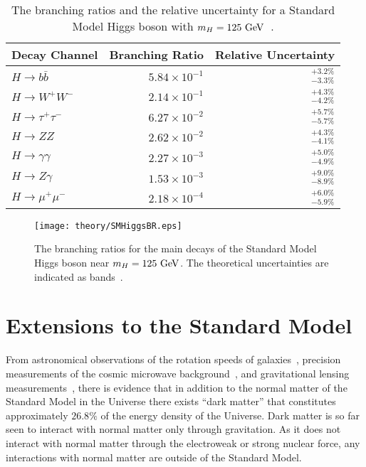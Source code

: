 \begin{table}[htpb]
 \centering
 \caption[The branching ratios and the relative uncertainty for a Standard Model Higgs boson with $m_{H}=125~\GeV$.]{%
  The branching ratios and the relative uncertainty for a Standard Model Higgs boson with $m_{H}=125~\GeV$~\cite{PDG2018:Ch11}.}
 \begin{tabular}{@{}lrr@{}} \toprule
  Decay Channel           & Branching Ratio       & Relative Uncertainty \\ \midrule
  $H\to b\bar{b}$         & $5.84 \times 10^{-1}$ & $_{-3.3\%}^{+3.2\%}$ \\
  \addlinespace[0.3em]
  $H\to W^{+}W^{-}$       & $2.14 \times 10^{-1}$ & $_{-4.2\%}^{+4.3\%}$ \\
  \addlinespace[0.3em]
  $H\to \tau^{+}\tau^{-}$ & $6.27 \times 10^{-2}$ & $_{-5.7\%}^{+5.7\%}$ \\
  \addlinespace[0.3em]
  $H\to ZZ$               & $2.62 \times 10^{-2}$ & $_{-4.1\%}^{+4.3\%}$ \\
  \addlinespace[0.3em]
  $H\to \gamma\gamma$     & $2.27 \times 10^{-3}$ & $_{-4.9\%}^{+5.0\%}$ \\
  \addlinespace[0.3em]
  $H\to Z\gamma$          & $1.53 \times 10^{-3}$ & $_{-8.9\%}^{+9.0\%}$ \\
  \addlinespace[0.3em]
  $H\to \mu^{+}\mu^{-}$   & $2.18 \times 10^{-4}$ & $_{-5.9\%}^{+6.0\%}$ \\
  \bottomrule
 \end{tabular}\label{table:Higgs_BRs}%
\end{table}

\begin{figure}
 \centering
 \texttt{[image: theory/SMHiggsBR.eps]}
 \caption[The branching ratios for the main decays of the Standard Model Higgs boson near $m_{H}=125~\GeV$.]{%
  The branching ratios for the main decays of the Standard Model Higgs boson near $m_{H}=125~\GeV$.
  The theoretical uncertainties are indicated as bands~\cite{PDG2018:Ch11}.}
 \label{fig:Higgs_BRs}
\end{figure}

\section{Extensions to the Standard Model}

From astronomical observations of the rotation speeds of galaxies~\cite{Rubin:1970zza,Begeman:1991iy}, precision measurements of the cosmic microwave background~\cite{2013ApJS:darkmatter,Akrami:2018vks}, and gravitational lensing measurements~\cite{Trimble:10.1146,Bertone:2004pz,Feng:2010gw}, there is evidence that in addition to the normal matter of the Standard Model in the Universe there exists ``dark matter'' that constitutes approximately $26.8\%$ of the energy density of the Universe.
Dark matter is so far seen to interact with normal matter only through gravitation.
As it does not interact with normal matter through the electroweak or strong nuclear force, any interactions with normal matter are outside of the Standard Model.

